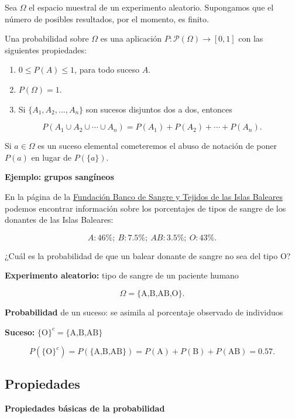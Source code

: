 \documentclass[]{book}
\providecommand{\tightlist}{%
  \setlength{\itemsep}{0pt}\setlength{\parskip}{0pt}}
\begin{document}
Sea \(\Omega\) el espacio muestral de un experimento aleatorio.
Supongamos que el número de posibles resultados, por el momento, es finito.

Una probabilidad sobre \(\Omega\) es una aplicación \(P:\mathcal{P}(\Omega)\to [0,1]\) con las siguientes propiedades:

\begin{enumerate}
\def\labelenumi{\arabic{enumi}.}
\tightlist
\item
  \(0\leq P(A)\leq 1\), para todo suceso \(A\).
\item
  \(P(\Omega)=1\).
\item
  Si \(\{A_1,A_2,\ldots,A_n\}\) son sucesos disjuntos dos a dos, entonces
\end{enumerate}

\[
P(A_1\cup A_2\cup \cdots \cup A_n)=P(A_1)+P(A_2)+\cdots +P(A_n).
\]

Si \(a\in \Omega\) es un suceso elemental cometeremos el abuso de notación de poner \(P(a)\) en lugar de \(P(\{a\})\).

\textbf{Ejemplo: grupos sangíneos}

En la página de la \href{http://www.donasang.org/que-es-la-sang/es_frequencies-dels-diferents-grups.html}{Fundación Banco de Sangre y Tejidos de las Islas Baleares} podemos encontrar información sobre los porcentajes de tipos de sangre de los donantes de las Islas Baleares:

\[A: 46\%;\ B: 7.5\%;\ AB: 3.5\%;\ O: 43\%.\]

¿Cuál es la probabilidad de que un balear donante de sangre no sea del tipo O?

\textbf{Experimento aleatorio:} tipo de sangre de un paciente humano

\[\Omega=\{\mbox{A,B,AB,O}\}.\]

\textbf{Probabilidad} de un suceso: se asimila al porcentaje observado de individuos

\textbf{Suceso:} \(\{\mbox{O}\}^c=\{\mbox{A,B,AB}\}\)

\[P(\{\mbox{O}\}^c)\!=\!P(\{\mbox{A,B,AB}\})\!=\!
P(\mbox{A})+P (\mbox{B})+P(\mbox{AB})\!=\!0.57.\]

\hypertarget{propiedades-1}{%
\subsection{Propiedades}\label{propiedades-1}}

\textbf{Propiedades básicas de la probabilidad}
\end{document}
